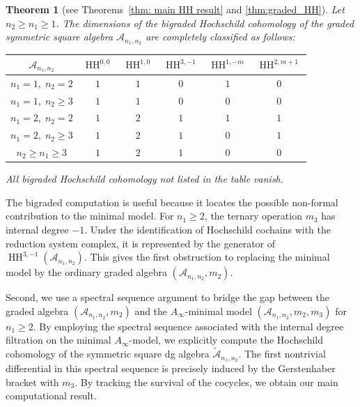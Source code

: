 \documentclass[a4paper, reqno, 11pt]{amsart}
\newtheorem{theorem}{Theorem}[section]
\theoremstyle{definition}
\begin{document}
	\begin{theorem}[see Theorems~\ref{thm: main HH result} and \ref{thm:graded_HH}]
		Let $n_2 \geq n_1 \geq 1$. The dimensions of the  bigraded  Hochschild cohomology of the graded symmetric square algebra $\mathcal{A}_{n_1,n_2}$   are completely classified as follows:
		\begin{center}
			\renewcommand{\arraystretch}{1.2}
			\begin{tabular}{c|ccccc}
				\hline
				$\mathcal{A}_{n_1,n_2}$& $\operatorname{HH}^{0,0}$ & $\operatorname{HH}^{1,0}$ & $\operatorname{HH}^{3,-1}$ & $\operatorname{HH}^{1,-m}$ & $\operatorname{HH}^{2,m+1}$ \\
				\hline
				$n_1=1,\; n_2=2$ & $1$ & $1$ & $0$ & $1$ & $0$  \\
				$n_1=1,\; n_2\ge 3$ & $1$ & $1$ & $0$ & $0$ & $0$ \\
				$n_1=2,\; n_2=2$ & $1$ & $2$ & $1$ & $1$ & $1$ \\
				$n_1=2,\; n_2\ge 3$ & $1$ & $2$ & $1$ & $0$ & $1$ \\
				$n_2\ge n_1 \ge 3$ & $1$ & $2$ & $1$ & $0$ & $0$ \\
				\hline
			\end{tabular}
		\end{center}
		All bigraded Hochschild cohomology not listed in the table vanish.
	\end{theorem} 
	
	The bigraded computation is useful because it locates the possible
	non-formal contribution to the minimal model. For \(n_1\ge 2\), the ternary operation \(m_3\) has internal degree \(-1\).
	Under the identification of Hochschild cochains with the reduction system complex, it is represented by the generator of \(\operatorname{HH}^{3,-1}(\mathcal A_{n_1,n_2})\). This gives the first obstruction to replacing the minimal model by the ordinary graded algebra \((\mathcal A_{n_1,n_2},m_2)\).
	
	Second, we use a spectral sequence argument to bridge the gap between the graded algebra $(\mathcal A_{n_1,n_2}, m_2)$ and the $A_\infty$-minimal model $(\mathcal A_{n_1,n_2}, m_2, m_3)$ for $n_1 \geq 2$. By employing the spectral sequence associated with the internal degree filtration on the minimal $A_\infty$-model, we explicitly compute the Hochschild cohomology of the symmetric square dg algebra $\widetilde{\mathcal{A}}_{n_1,n_2}$. The first nontrivial differential in this spectral sequence is precisely induced by the Gerstenhaber bracket with $m_3$. By tracking the survival of the cocycles, we obtain our main computational result.
	
\end{document}
